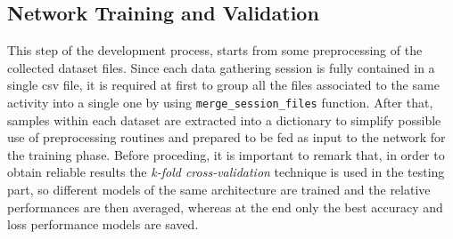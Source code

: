 \inputminted[framesep=1cm, firstline=52, lastline=68, bgcolor=whitesmoke, fontsize=\tiny]{python}{code/neural_network.py}
\newpage





\subsection{Network Training and Validation}
This step of the development process, starts from some preprocessing of the collected dataset files. Since each data gathering session is fully contained in a single csv file, it is required at first to group all the files associated to the same activity into a single one by using
\texttt{merge_session_files} function.\newline
After that, samples within each dataset are extracted into a dictionary to simplify possible use of preprocessing routines and prepared to be fed as input to the network for the training phase. Before proceding, it is important to remark that, in order to obtain reliable results the \textit{k-fold cross-validation} technique is used in the testing part, so different models of the same architecture are trained and the relative performances are then averaged, whereas at the end only the best accuracy and loss performance models are saved. 


